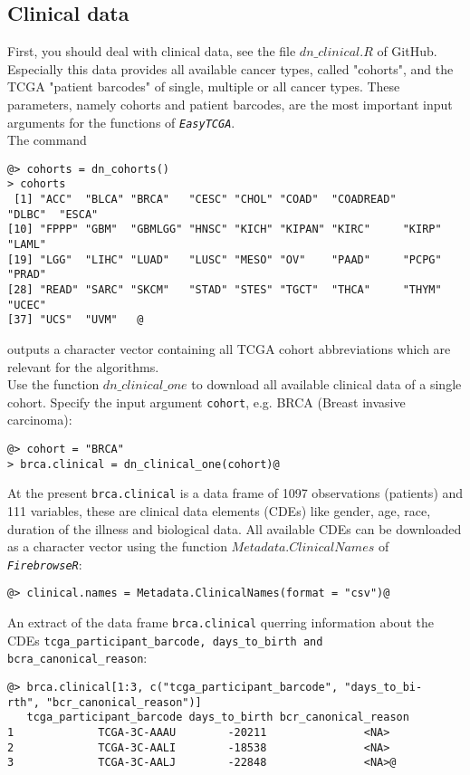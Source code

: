 \documentclass{TechReport}
\begin{document}
\subsection{Clinical data}
First, you should deal with clinical data, see the file $dn\_clinical.R$ of GitHub.
Especially this data provides all available cancer types, called "cohorts", 
and the TCGA  "patient barcodes"  of single, multiple or all cancer types. These
parameters, namely cohorts and patient barcodes, are the most
important input arguments for the functions of \texttt{\em EasyTCGA}. \\
The command
\begin{lstlisting}[style=base]
@> cohorts = dn_cohorts()
> cohorts
 [1] "ACC"  "BLCA" "BRCA"   "CESC" "CHOL" "COAD"  "COADREAD" 
"DLBC"  "ESCA"    
[10] "FPPP" "GBM"  "GBMLGG" "HNSC" "KICH" "KIPAN" "KIRC"     "KIRP"  "LAML"    
[19] "LGG"  "LIHC" "LUAD"   "LUSC" "MESO" "OV"    "PAAD"     "PCPG"  "PRAD"    
[28] "READ" "SARC" "SKCM"   "STAD" "STES" "TGCT"  "THCA"     "THYM"  "UCEC"    
[37] "UCS"  "UVM"   @
\end{lstlisting}
outputs a character vector containing all TCGA cohort abbreviations which are
relevant for the algorithms.\\
Use the function $dn\_clinical\_one$ to download all available clinical data of a
single cohort. Specify the input argument {\tt cohort}, e.g. BRCA 
(Breast invasive carcinoma):  
\begin{lstlisting}[style=base]
@> cohort = "BRCA"
> brca.clinical = dn_clinical_one(cohort)@
\end{lstlisting}
At the present {\tt brca.clinical} is a data frame of 1097 observations (patients)
and 111 variables, these are clinical data elements (CDEs) like 
gender, age, race, duration of the illness and biological data. All available CDEs
can be downloaded as a character vector using the 
function $Metadata.ClinicalNames$ of \texttt{\em FirebrowseR}:
\begin{lstlisting}[style=base]
@> clinical.names = Metadata.ClinicalNames(format = "csv")@
\end{lstlisting}
An extract of the data frame {\tt brca.clinical} querring information about the CDEs
{\tt tcga\_participant\_barcode, days\_to\_birth and bcra\_canonical\_reason}:
\begin{lstlisting}[style=base]
@> brca.clinical[1:3, c("tcga_participant_barcode", "days_to_bi-
rth", "bcr_canonical_reason")]
   tcga_participant_barcode days_to_birth bcr_canonical_reason
1             TCGA-3C-AAAU        -20211               <NA>
2             TCGA-3C-AALI        -18538               <NA>
3             TCGA-3C-AALJ        -22848               <NA>@
\end{lstlisting}
\end{document}
